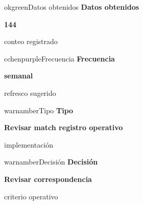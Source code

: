 \documentclass[9pt,a4paper]{extarticle}
\begin{document}
\vspace{0.04cm}
\begin{minipage}{0.24\textwidth}
\begin{metricbox}{okgreen}{Datos obtenidos}
{\large\bfseries Datos obtenidos}\par
{\Large\bfseries 144}\par
{\normalsize conteo registrado}
\end{metricbox}
\end{minipage}\hfill
\begin{minipage}{0.24\textwidth}
\begin{metricbox}{cchenpurple}{Frecuencia}
{\large\bfseries Frecuencia}\par
{\large\bfseries semanal}\par
{\normalsize refresco sugerido}
\end{metricbox}
\end{minipage}\hfill
\begin{minipage}{0.24\textwidth}
\begin{metricbox}{warnamber}{Tipo}
{\large\bfseries Tipo}\par
{\normalsize\bfseries Revisar match registro operativo}\par
{\normalsize implementación}
\end{metricbox}
\end{minipage}\hfill
\begin{minipage}{0.24\textwidth}
\begin{metricbox}{warnamber}{Decisión}
{\large\bfseries Decisión}\par
{\normalsize\bfseries Revisar correspondencia}\par
{\normalsize criterio operativo}
\end{metricbox}
\end{minipage}
\end{document}
